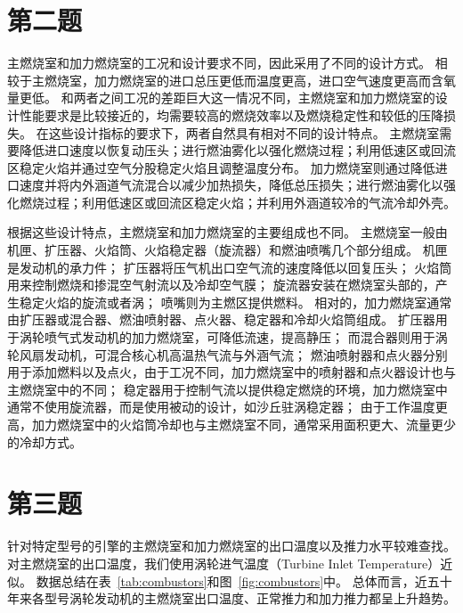 \section{第二题}

主燃烧室和加力燃烧室的工况和设计要求不同，因此采用了不同的设计方式。
相较于主燃烧室，加力燃烧室的进口总压更低而温度更高，进口空气速度更高而含氧量更低。
和两者之间工况的差距巨大这一情况不同，主燃烧室和加力燃烧室的设计性能要求是比较接近的，均需要较高的燃烧效率以及燃烧稳定性和较低的压降损失。
在这些设计指标的要求下，两者自然具有相对不同的设计特点。
主燃烧室需要降低进口速度以恢复动压头；进行燃油雾化以强化燃烧过程；利用低速区或回流区稳定火焰并通过空气分股稳定火焰且调整温度分布。
加力燃烧室则通过降低进口速度并将内外涵道气流混合以减少加热损失，降低总压损失；进行燃油雾化以强化燃烧过程；利用低速区或回流区稳定火焰；并利用外涵道较冷的气流冷却外壳。

根据这些设计特点，主燃烧室和加力燃烧室的主要组成也不同。
主燃烧室一般由机匣、扩压器、火焰筒、火焰稳定器（旋流器）和燃油喷嘴几个部分组成。
机匣是发动机的承力件；
扩压器将压气机出口空气流的速度降低以回复压头；
火焰筒用来控制燃烧和掺混空气射流以及冷却空气膜；
旋流器安装在燃烧室头部的，产生稳定火焰的旋流或者涡；
喷嘴则为主燃区提供燃料。
相对的，加力燃烧室通常由扩压器或混合器、燃油喷射器、点火器、稳定器和冷却火焰筒组成。
扩压器用于涡轮喷气式发动机的加力燃烧室，可降低流速，提高静压；
而混合器则用于涡轮风扇发动机，可混合核心机高温热气流与外涵气流；
燃油喷射器和点火器分别用于添加燃料以及点火，由于工况不同，加力燃烧室中的喷射器和点火器设计也与主燃烧室中的不同；
稳定器用于控制气流以提供稳定燃烧的环境，加力燃烧室中通常不使用旋流器，而是使用被动的设计，如沙丘驻涡稳定器；
由于工作温度更高，加力燃烧室中的火焰筒冷却也与主燃烧室不同，通常采用面积更大、流量更少的冷却方式。

\section{第三题}

针对特定型号的引擎的主燃烧室和加力燃烧室的出口温度以及推力水平较难查找。
对主燃烧室的出口温度，我们使用涡轮进气温度（Turbine Inlet Temperature）近似。
数据总结在表~\ref{tab:combustors}和图~\ref{fig:combustors}中。
总体而言，近五十年来各型号涡轮发动机的主燃烧室出口温度、正常推力和加力推力都呈上升趋势。

